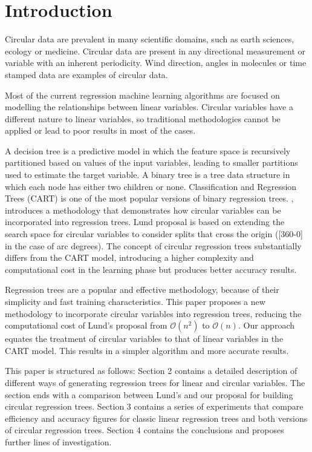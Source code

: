 \documentclass[times,twocolumn,final,authoryear]{elsarticle}
\begin{document}

\section{Introduction}
\label{intro}
Circular data are prevalent in many scientific domains, such as earth sciences, ecology or medicine. Circular data are present in any directional measurement or variable with an inherent periodicity. Wind direction, angles in molecules or time stamped data are examples of circular data.

Most of the current regression machine learning algorithms are focused on modelling the relationships between linear variables. Circular variables have a different nature to linear variables, so traditional methodologies cannot be applied or lead to poor results in most of the cases.

A decision tree is a predictive model in which the feature space is recursively partitioned based on values of the input variables, leading to smaller partitions used to estimate the target variable. A binary tree is a tree data structure in which each node has either two children or none. Classification and Regression Trees (CART) \citep{Breimanetal1984} is one of the most popular versions of binary regression trees. \citep{Lund2002}, introduces a methodology that demonstrates how circular variables can be incorporated into regression trees. Lund proposal is based on extending the search space for circular variables to consider splits that cross the origin ([360-0] in the case of arc degrees). The concept of circular regression trees substantially differs from the CART model, introducing a higher complexity and computational cost in the learning phase but produces better accuracy results. 

Regression trees are a popular and effective methodology, because of their simplicity and fast training characteristics. This paper proposes a new methodology to incorporate circular variables into regression trees, reducing the computational cost of Lund's proposal from $\mathcal{O}(n^2)$ to $\mathcal{O}(n)$. Our approach equates the treatment of circular variables to that of linear variables in the CART model. This results in a simpler algorithm and more accurate results.

This paper is structured as follows: Section 2 contains a detailed description of different ways of generating regression trees for linear and circular variables. The section ends with a comparison between Lund's and our proposal for building circular regression trees. Section 3 contains a series of experiments that compare efficiency and accuracy figures for classic linear regression trees and both versions of circular regression trees. Section 4 contains the conclusions and proposes further lines of investigation.
\end{document}
